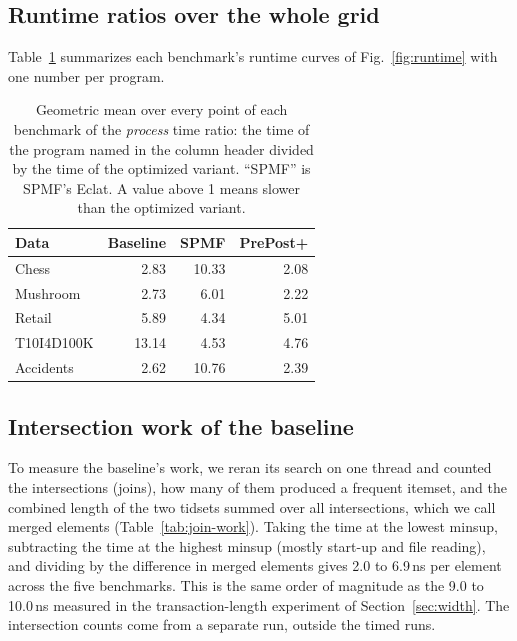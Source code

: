 \subsection{Runtime ratios over the whole grid}
\label{app:ratios}
Table~\ref{tab:runtime-ratio} summarizes each benchmark's runtime curves of
Fig.~\ref{fig:runtime} with one number per program.

\begin{table}[t]
\centering
\small
\setlength{\tabcolsep}{4pt}
\caption{Geometric mean over every point of each benchmark of the \emph{process} time
ratio: the time of the program named in the column header divided by the time of the
optimized variant. ``SPMF'' is SPMF's Eclat. A value above 1 means slower than the
optimized variant.}
\label{tab:runtime-ratio}
\begin{tabular}{lrrr}
\hline
Data & Baseline & SPMF & PrePost+ \\
\hline
Chess & 2.83 & 10.33 & 2.08 \\
Mushroom & 2.73 & 6.01 & 2.22 \\
Retail & 5.89 & 4.34 & 5.01 \\
T10I4D100K & 13.14 & 4.53 & 4.76 \\
Accidents & 2.62 & 10.76 & 2.39 \\
\hline
\end{tabular}
\end{table}

\subsection{Intersection work of the baseline}
\label{app:join-work}
To measure the baseline's work, we reran its search on one thread and counted the
intersections (joins), how many of them produced a frequent itemset, and the combined
length of the two tidsets summed over all intersections, which we call merged elements
(Table~\ref{tab:join-work}). Taking the time at the lowest minsup, subtracting the time at
the highest minsup (mostly start-up and file reading), and dividing by the difference in
merged elements gives 2.0 to 6.9\,ns per element across the five benchmarks. This is the
same order of magnitude as the 9.0 to 10.0\,ns measured in the transaction-length
experiment of Section~\ref{sec:width}. The intersection counts come from a separate run,
outside the timed runs.

